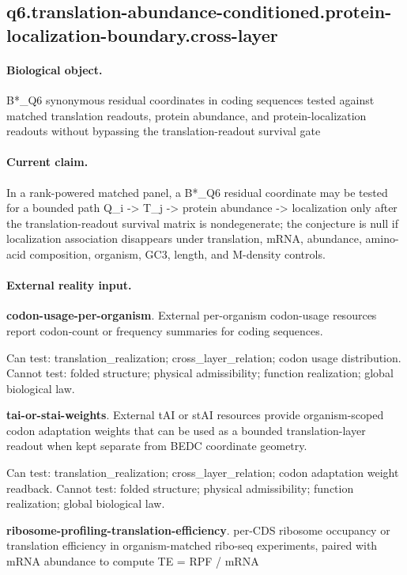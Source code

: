 \subsection{q6.translation-abundance-conditioned.protein-localization-boundary.cross-layer}

\paragraph{Biological object.} B*\_Q6 synonymous residual coordinates in coding sequences tested against matched translation readouts, protein abundance, and protein-localization readouts without bypassing the translation-readout survival gate

\paragraph{Current claim.} In a rank-powered matched panel, a B*\_Q6 residual coordinate may be tested for a bounded path Q\_i -> T\_j -> protein abundance -> localization only after the translation-readout survival matrix is nondegenerate; the conjecture is null if localization association disappears under translation, mRNA, abundance, amino-acid composition, organism, GC3, length, and M-density controls.

\paragraph{External reality input.}
\textbf{codon-usage-per-organism}. External per-organism codon-usage resources report codon-count or frequency summaries for coding sequences.

Can test: translation\_realization; cross\_layer\_relation; codon usage distribution. Cannot test: folded structure; physical admissibility; function realization; global biological law.

\textbf{tai-or-stai-weights}. External tAI or stAI resources provide organism-scoped codon adaptation weights that can be used as a bounded translation-layer readout when kept separate from BEDC coordinate geometry.

Can test: translation\_realization; cross\_layer\_relation; codon adaptation weight readback. Cannot test: folded structure; physical admissibility; function realization; global biological law.

\textbf{ribosome-profiling-translation-efficiency}. per-CDS ribosome occupancy or translation efficiency in organism-matched ribo-seq experiments, paired with mRNA abundance to compute TE = RPF / mRNA

